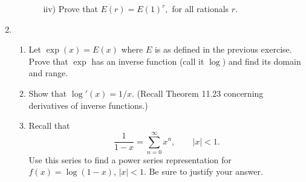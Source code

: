 \documentclass[openany, amssymb, psamsfonts]{amsart}
\theoremstyle{definition}
\numberwithin{equation}{section}
\begin{document}
\begin{enumerate}
\begin{enumerate}
\begin{enumerate}
\item[iiv)]
Prove that $E(r)=E(1)^r,$ for all rationals $r.$
\end{enumerate} 
\end{enumerate}

 















\item

\begin{enumerate}

\item
Let $\exp (x)=E(x)$ where $E$ is as defined in the previous exercise. Prove that $\exp$ has an inverse function (call it $\log$) and find its domain and range.


\item
Show that $\log'(x)=1/x$. (Recall Theorem 11.23 concerning derivatives of inverse functions.)

\item
Recall that 
\[
\frac1{1-x}=\sum_{n=0}^\infty x^n,\qquad|x|<1.
\]
Use this series to find a power series  representation for $f(x)=\log(1-x)$, $|x|<1$. Be sure to justify your answer.


\end{enumerate}



\end{enumerate}
\end{document}

